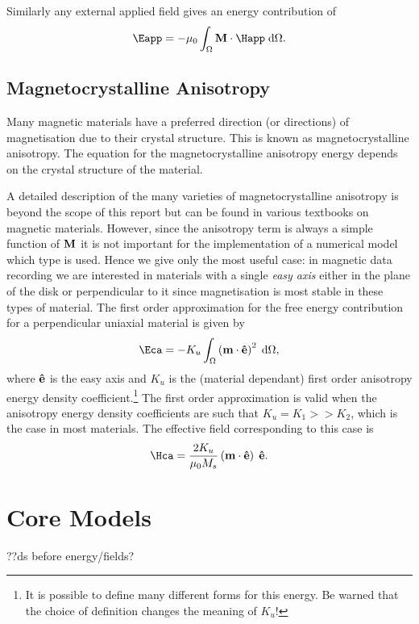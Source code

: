 Similarly any external applied field gives an energy contribution of
\begin{equation}
  \label{eq:42}
  \Eapp = - \mu_0 \int_{\magd} \Mv \cdot \Happ \d \magd.
\end{equation}

\subsection{Magnetocrystalline Anisotropy}
\label{sec:magn-anis}

Many magnetic materials have a preferred direction (or directions) of magnetisation due to their crystal structure. This is known as magnetocrystalline anisotropy. The equation for the magnetocrystalline anisotropy energy depends on the crystal structure of the material.

A detailed description of the many varieties of magnetocrystalline anisotropy is beyond the scope of this report but can be found in various textbooks on magnetic materials.\cite{Coey2010}\cite{Aharoni1996} However, since the anisotropy term is always a simple function of $\mathbf{M}$ it is not important for the implementation of a numerical model which type is used. Hence we give only the most useful case: in magnetic data recording we are interested in materials with a single \emph{easy axis} either in the plane of the disk or perpendicular to it since magnetisation is most stable in these types of material. The first order approximation for the free energy contribution for a perpendicular uniaxial material is given by
\begin{equation}
  \Eca = -K_u \int_\magd \left( \mv \cdot \ev \right)^2 \d \magd,
  \label{eq:36}
\end{equation}
where $\mathbf{\hat{e}}$ is the easy axis and $K_u$ is the (material dependant) first order anisotropy energy density coefficient.\footnote{It is possible to define many different forms for this energy. Be warned that the choice of definition changes the meaning of $K_u$!} The first order approximation is valid when the anisotropy energy density coefficients are such that $K_u = K_1 >> K_2$, which is the case in most materials.\cite{Kronmuller2003} The effective field corresponding to this case is
\begin{equation}
  \Hca = \frac{2 K_u}{\mu_0 M_s} \left( \mv \cdot \ev \right) \; \ev.
  \label{eq:Hca}
\end{equation}


\section{Core Models}
??ds before energy/fields?

